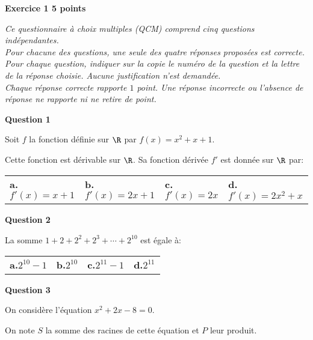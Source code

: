 \textbf{\large Exercice 1 \hfill 5 points}

\bigskip

\emph{Ce questionnaire à choix multiples (QCM) comprend cinq questions indépendantes.\\
Pour chacune des questions, une seule des quatre réponses proposées est correcte.\\
Pour chaque question, indiquer sur la copie le numéro de la question et la lettre de la réponse choisie. Aucune justification n’est demandée.\\
Chaque réponse correcte rapporte $1$ point. Une réponse incorrecte ou l'absence de réponse ne rapporte ni ne retire de point.}

\bigskip

\textbf{Question 1}

\medskip

Soit $f$ la fonction définie sur $\R$ par $f(x) = x^2+x+1$.

Cette fonction est dérivable sur $\R$. Sa fonction dérivée $f'$ est donnée sur $\R$ par:

\begin{center}
{\renewcommand{\arraystretch}{1.5}
\begin{tabularx}{\linewidth}{XXXX}
\textbf{a.}\quad $f'(x)=x+1$ & \textbf{b.}\quad $f'(x)=2x+1$ 
& \textbf{c.}\quad $f'(x)=2x$   & \textbf{d.}\quad $f'(x)=2x^2+x$\\
\end{tabularx}}
\end{center}

\medskip

\textbf{Question 2}

\medskip

La somme $1+2+2^2 + 2^3 + \cdots + 2^{10}$ est égale à:

\begin{center}
{\renewcommand{\arraystretch}{1.5}
\begin{tabularx}{0.9\linewidth}{XXXX}
\textbf{a.}\quad $2^{10}-1$ & \textbf{b.}\quad $2^{10}$ 
& \textbf{c.}\quad $2^{11}-1$   & \textbf{d.}\quad $2^{11}$\\
\end{tabularx}}
\end{center}

\medskip

\textbf{Question 3}

\medskip

On considère l'équation $x^2+2x-8=0$.

On note $S$ la somme des racines de cette équation et $P$ leur produit.

